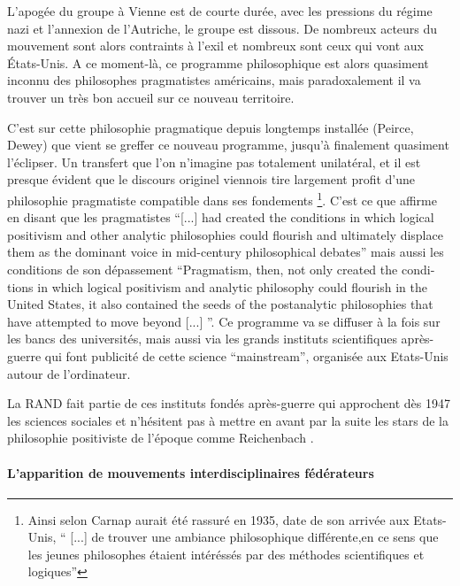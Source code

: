 L'apogée du groupe à Vienne est de courte durée, avec les pressions du régime nazi et l'annexion de l'Autriche, le groupe est dissous. De nombreux acteurs du mouvement sont alors contraints à l'exil et nombreux sont ceux qui vont aux États-Unis. A ce moment-là, ce programme philosophique est alors quasiment inconnu des philosophes pragmatistes américains, mais paradoxalement il va trouver un très bon accueil sur ce nouveau territoire.

C'est sur cette philosophie pragmatique depuis longtemps installée (Peirce, Dewey) que vient se greffer ce nouveau programme, jusqu'à finalement quasiment l'éclipser. Un transfert que l'on n'imagine pas totalement unilatéral, et il est presque évident que le discours originel viennois tire largement profit d'une philosophie pragmatiste compatible dans ses fondements \footnote{ Ainsi selon \textcite[149]{Ouelbani2006} Carnap aurait été rassuré en 1935, date de son arrivée aux Etats-Unis, \enquote{ [...] de trouver une ambiance philosophique différente,en ce sens que les jeunes philosophes étaient intéréssés par des méthodes scientifiques et logiques}}. C'est ce que \textcite[123]{Wilson1995} affirme en disant que les pragmatistes \foreignquote{english}{[...] had created the conditions in which logical positivism and other analytic philosophies could flourish and ultimately displace them as the dominant voice in mid-century philosophical debates} mais aussi les conditions de son dépassement \foreignquote{english}{Pragmatism, then, not only created the conditions in which logical positivism and analytic philosophy could flourish in the United States, it also contained the seeds of the postanalytic philosophies that have attempted to move beyond [...] }. Ce programme va se diffuser à la fois sur les bancs des universités, mais aussi via les grands instituts scientifiques après-guerre qui font publicité de cette science \foreignquote{english}{mainstream}, organisée aux Etats-Unis autour de l'ordinateur. 

La RAND fait partie de ces instituts fondés après-guerre qui approchent dès 1947 les sciences sociales \autocite{Rand106} et n'hésitent pas à mettre en avant par la suite les stars de la philosophie positiviste de l'époque comme Reichenbach \autocite[384-385]{Barnes2011} .

\paragraph{L'apparition de mouvements interdisciplinaires fédérateurs}

